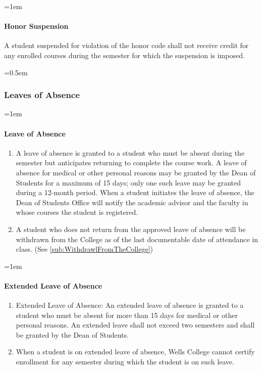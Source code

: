 \documentclass{manual}
\newcommand{\modified}[1]{}
\newcommand{\oldbreak}[1]{}
\let\oldsubsubsection\subsubsection
\renewcommand\subsubsection{\leftskip=0.5em\oldsubsubsection}
\let\oldparagraph\paragraph
\renewcommand\paragraph{\leftskip=1em\oldparagraph}
\begin{document}
\paragraph{Honor Suspension}
A student suspended for violation of the honor code shall not receive credit for any enrolled courses during the semester for which the suspension is imposed.

\subsubsection{Leaves of Absence}

\paragraph{Leave of Absence} \modified{5/9/95}

\begin{enumerate}[label=\alph*)]
\item A leave of absence is granted to a student who must be absent during the semester but anticipates returning to complete the course work. A leave of absence for medical or other personal reasons may be granted by the Dean of Students for a maximum of 15 days; only one such leave may be granted during a 12-month period. When a student initiates the leave of absence, the Dean of Students Office will notify the academic advisor and the faculty in whose courses the student is registered.
\item A student who does not return from the approved leave of absence will be withdrawn from the College as of the last documentable date of attendance in class. (See \cref{sub:WithdrawlFromTheCollege})
\end{enumerate}

\oldbreak{IX-1}

\paragraph{Extended Leave of Absence}

\begin{enumerate}[label=\alph*)]
\item Extended Leave of Absence: An extended leave of absence is granted to a student who must be absent for more than 15 days for medical or other personal reasons. An extended leave shall not exceed two semesters and shall be granted by the Dean of Students. 
\item When a student is on extended leave of absence, Wells College cannot certify enrollment for  any semester during which the student is on such leave.
\end{enumerate}
\end{document}
